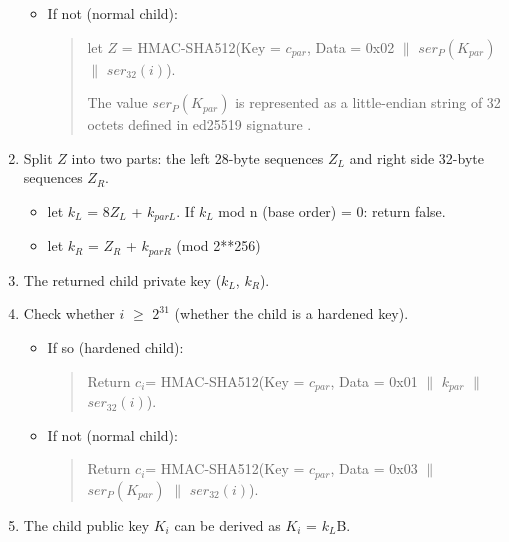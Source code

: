 \begin{adjustwidth}{0.5cm}{}
\begin{enumerate}
\begin{itemize}
\begin{quote}
                        \end{quote}

                  \item If not (normal child):
                        \begin{quote}
                            let $Z$ = HMAC-SHA512(Key = $c_{par}$, Data = 0x02 $\parallel$ $ser_{P}(K_{par})$ $\parallel$ $ser_{32}(i)$).

                            The value $ser_P(K_{par})$ is represented as a little-endian string of 32 octets defined in ed25519 signature \cite{DBLP:journals/rfc/rfc8032}.

                        \end{quote}
              \end{itemize}
              \bigskip

        \item Split $Z$ into two parts: the left 28-byte sequences $Z_L$ and right side 32-byte sequences $Z_R$.
              \begin{itemize}
                  \item let $k_L$ = 8$Z_L$ +  $k_{parL}$. If $k_L$ mod n (base order) = 0: return false.

                  \item let  $k_R$ = $Z_R$ +  $k_{parR}$ (mod 2**256)

              \end{itemize}
              \bigskip

        \item The returned child private key ($k_L$, $k_R$).

              \bigskip
        \item Check whether $i$ $\geq$ $2^{31}$ (whether the child is a hardened key).
              \begin{itemize}
                  \item If so (hardened child):
                        \begin{quote}
                            Return  $c_i$= HMAC-SHA512(Key = $c_{par}$, Data = 0x01 $\parallel$ $k_{par}$ $\parallel$ $ser_{32}(i)$).
                        \end{quote}
                  \item If not (normal child):
                        \begin{quote}
                            Return  $c_i$= HMAC-SHA512(Key = $c_{par}$, Data = 0x03 $\parallel$ $ser_P(K_{par})$ $\parallel$ $ser_{32}(i)$).
                        \end{quote}
              \end{itemize}
              \bigskip
        \item The child public key $K_i$ can be derived as $K_i$ = $k_L$B.


\end{enumerate}
\end{adjustwidth}
